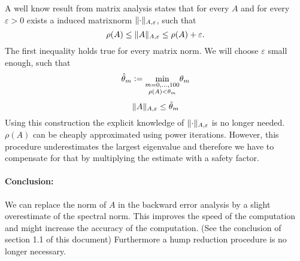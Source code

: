 \documentclass{scrartcl}
\newcommand{\defneq}{\mathrel{\mathop:}=}
\DeclarePairedDelimiter\norm{\lVert}{\rVert}%
\begin{document}
A well know result from matrix analysis states that for every $A$ and for every $\varepsilon>0$ exists a induced matrixnorm $\norm{\cdot}_{A,\varepsilon}$, such that
\[\rho(A) \le \norm{A}_{A,\varepsilon} \le \rho(A) + \varepsilon. \]
The first inequality holds true for every matrix norm. We will choose $\varepsilon$ small enough, such that
\[\hat\theta_m \defneq \underset{\begin{subarray}{c}m=0,\dots,100\\\rho(A) < \theta_m\end{subarray}}{\min}\theta_m\]
\[\norm{A}_{A,\varepsilon} \le \hat\theta_m\]
Using this construction the explicit knowledge of $\norm{\cdot}_{A,\varepsilon}$ is no longer needed. $\rho(A)$ can be cheaply approximated using power iterations. However, this procedure underestimates the largest eigenvalue and therefore we have to compensate for that by multiplying the estimate with a safety factor. 

\paragraph{Conclusion:} We can replace the norm of $A$ in the backward error analysis by a slight overestimate of the spectral norm. This improves the speed of the computation and might increase the accuracy of the computation. (See the conclusion of section 1.1 of this document) Furthermore a hump reduction procedure is no longer necessary.
\end{document}
